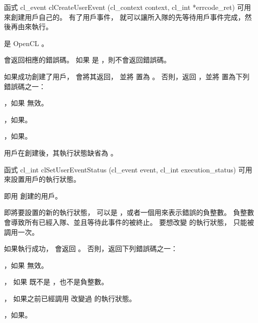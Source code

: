 函式
\startCLFUNC
cl_event clCreateUserEvent (cl_context context,
			cl_int *errcode_ret)
\stopCLFUNC
可用來創建用戶自己的。
有了用戶事件，
就可以讓所入隊的先等待用戶事件完成，然後再由來執行。

 是 OpenCL 。

 會返回相應的錯誤碼。
如果  是 ，則不會返回錯誤碼。

如果成功創建了用戶，  會將其返回，
並將  置為 。
否則，返回 ，並將  置為下列錯誤碼之一：
\startigBase
\item {}，如果  無效。

\item {}，如果\scdevfailres。

\item {}，如果\schostfailres。
\stopigBase

用戶在創建後，其執行狀態缺省為 。

函式
\startCLFUNC
cl_int clSetUserEventStatus (cl_event event,
			cl_int execution_status)
\stopCLFUNC
可用來設置用戶的執行狀態。

 即用  創建的用戶。

 即將要設置的新的執行狀態，
可以是 ，或者一個用來表示錯誤的負整數。
負整數會導致所有已經入隊、並且等待此事件的被終止。
要想改變  的執行狀態，  只能被調用一次。

如果執行成功，  會返回 。
否則，返回下列錯誤碼之一：
\startigBase
\item {}，如果  無效。

\item {}，
如果  既不是 ，也不是負整數。

\item {}，
如果之前已經調用  改變過  的執行狀態。

\item {}，如果\scdevfailres。

